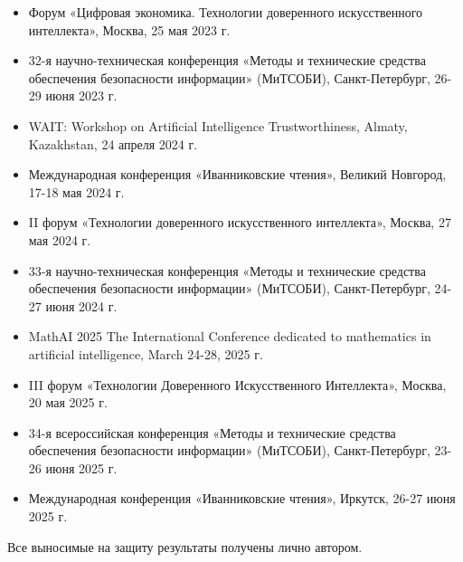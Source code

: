 \begin{itemize}
    \item Форум «Цифровая экономика. Технологии доверенного искусственного интеллекта», Москва, 25 мая 2023 г.
    \item 32-я научно-техническая конференция «Методы и технические средства обеспечения безопасности информации» (МиТСОБИ), Санкт-Петербург, 26-29 июня 2023 г.
    \item WAIT: Workshop on Artificial Intelligence Trustworthiness, Almaty, Kazakhstan, 24 апреля 2024 г.
    \item Международная конференция «Иванниковские чтения», Великий Новгород, 17-18 мая 2024 г.
    \item II форум «Технологии доверенного искусственного интеллекта», Москва, 27 мая 2024 г.    
    \item 33-я научно-техническая конференция «Методы и технические средства обеспечения безопасности информации» (МиТСОБИ), Санкт-Петербург, 24-27 июня 2024 г.
    \item MathAI 2025 The International Conference dedicated to mathematics in artificial intelligence, March 24-28, 2025 г.
    \item III форум «Технологии Доверенного Искусственного Интеллекта», Москва, 20 мая 2025 г.
    \item 34-я всероссийская конференция «Методы и технические средства обеспечения безопасности информации» (МиТСОБИ), Санкт-Петербург, 23-26 июня 2025 г.
    \item Международная конференция «Иванниковские чтения», Иркутск, 26-27 июня 2025 г.
\end{itemize}

{\contribution} Все выносимые на защиту результаты получены лично автором.

